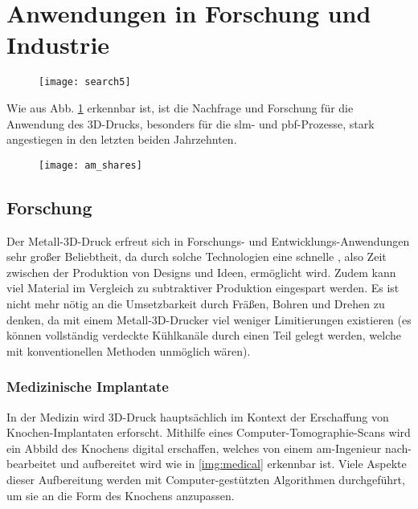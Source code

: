 \documentclass[../main.tex]{subfiles}
\begin{document}
\section{Anwendungen in Forschung und Industrie}
\label{sec:anwendungen}
\begin{figure}[H]
	\centering
	\texttt{[image: search5]}
	\label{img:search_5}
\end{figure}
Wie aus Abb. \ref{img:search_5} erkennbar ist, ist die Nachfrage und Forschung für die Anwendung des 3D-Drucks, besonders für die \acrlong{slm}- und \acrfull{pbf}-Prozesse, stark angestiegen in den letzten beiden Jahrzehnten.

\begin{figure}[H]
	\centering
	\texttt{[image: am\_shares]}
	\label{img:am_shares}
\end{figure} 
\subsection{Forschung}
Der Metall-3D-Druck erfreut sich in Forschungs- und Entwicklungs-Anwendungen sehr großer Beliebtheit, da durch solche Technologien eine schnelle , also Zeit zwischen der Produktion von Designs und Ideen, ermöglicht wird. Zudem kann viel Material im Vergleich zu subtraktiver Produktion eingespart werden. Es ist nicht mehr nötig an die Umsetzbarkeit durch Fräßen, Bohren und Drehen zu denken, da mit einem Metall-3D-Drucker viel weniger Limitierungen existieren (es können vollständig verdeckte Kühlkanäle durch einen Teil gelegt werden, welche mit konventionellen Methoden unmöglich wären).
\subsubsection*{Medizinische Implantate}
\label{sec:medizin}
In der Medizin wird 3D-Druck hauptsächlich im Kontext der Erschaffung von Knochen-Implantaten erforscht. Mithilfe eines Computer-Tomographie-Scans wird ein Abbild des Knochens digital erschaffen, welches von einem \acrshort{am}-Ingenieur nach-bearbeitet und aufbereitet wird wie in \ref{img:medical} erkennbar ist. Viele Aspekte dieser Aufbereitung werden mit Computer-gestützten Algorithmen durchgeführt, um sie an die Form des Knochens anzupassen.\parencite{doi:10.1146/annurev-bioeng-082020-032402}
\end{document}
